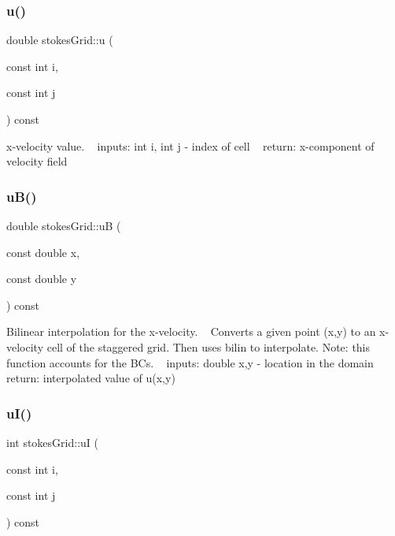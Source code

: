 \subsubsection{\texorpdfstring{u()}{u()}}
{\footnotesize\ttfamily double stokes\+Grid\+::u (\begin{DoxyParamCaption}\item[{const int}]{i,  }\item[{const int}]{j }\end{DoxyParamCaption}) const}

x-\/velocity value. ~\newline
inputs\+: int i, int j -\/ index of cell ~\newline
return\+: x-\/component of velocity field \mbox{\label{classstokesGrid_ab0cbcaafe11c8fc6a7d0f535cc2ab4ce}} 
\subsubsection{\texorpdfstring{u\+B()}{uB()}}
{\footnotesize\ttfamily double stokes\+Grid\+::uB (\begin{DoxyParamCaption}\item[{const double}]{x,  }\item[{const double}]{y }\end{DoxyParamCaption}) const}

Bilinear interpolation for the x-\/velocity. ~\newline
Converts a given point (x,y) to an x-\/velocity cell of the staggered grid. Then uses bilin to interpolate. Note\+: this function accounts for the B\+Cs. ~\newline
inputs\+: double x,y -\/ location in the domain ~\newline
return\+: interpolated value of u(x,y) ~\newline
\mbox{\label{classstokesGrid_a6a8dd61e5d32fb30978508b7abeafd48}} 
\subsubsection{\texorpdfstring{u\+I()}{uI()}}
{\footnotesize\ttfamily int stokes\+Grid\+::uI (\begin{DoxyParamCaption}\item[{const int}]{i,  }\item[{const int}]{j }\end{DoxyParamCaption}) const}

